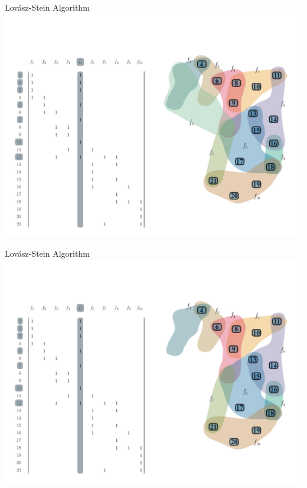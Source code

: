 \documentclass[10pt]{beamer}
\begin{document}
\begin{frame}[fragile]{Lovász-Stein Algorithm}
    \vspace*{-3em}\hspace*{-2em}\includegraphics[width=1.15\textwidth]{Images/LSAExample/03}
\end{frame}

\begin{frame}[fragile]{Lovász-Stein Algorithm}
    \vspace*{-3em}\hspace*{-2em}\includegraphics[width=1.15\textwidth]{Images/LSAExample/04}
\end{frame}
\end{document}
